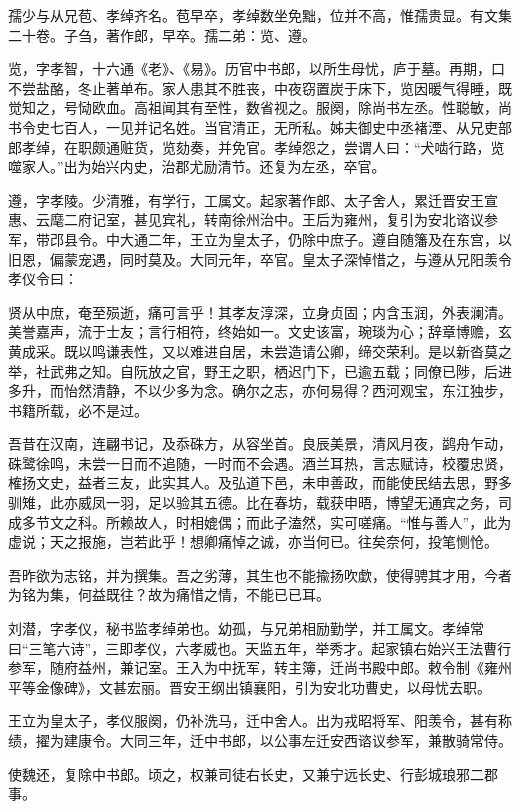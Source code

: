 \documentclass[12pt,UTF8]{ctexbook}
\begin{document}
孺少与从兄苞、孝绰齐名。苞早卒，孝绰数坐免黜，位并不高，惟孺贵显。有文集二十卷。子刍，著作郎，早卒。孺二弟：览、遵。

览，字孝智，十六通《老》、《易》。历官中书郎，以所生母忧，庐于墓。再期，口不尝盐酪，冬止著单布。家人患其不胜丧，中夜窃置炭于床下，览因暖气得睡，既觉知之，号恸欧血。高祖闻其有至性，数省视之。服阕，除尚书左丞。性聪敏，尚书令史七百人，一见并记名姓。当官清正，无所私。姊夫御史中丞褚湮、从兄吏部郎孝绰，在职颇通赃货，览劾奏，并免官。孝绰怨之，尝谓人曰：“犬啮行路，览噬家人。”出为始兴内史，治郡尤励清节。还复为左丞，卒官。

遵，字孝陵。少清雅，有学行，工属文。起家著作郎、太子舍人，累迁晋安王宣惠、云麾二府记室，甚见宾礼，转南徐州治中。王后为雍州，复引为安北谘议参军，带邔县令。中大通二年，王立为皇太子，仍除中庶子。遵自随籓及在东宫，以旧恩，偏蒙宠遇，同时莫及。大同元年，卒官。皇太子深悼惜之，与遵从兄阳羡令孝仪令曰：

贤从中庶，奄至殒逝，痛可言乎！其孝友淳深，立身贞固；内含玉润，外表澜清。美誉嘉声，流于士友；言行相符，终始如一。文史该富，琬琰为心；辞章博赡，玄黄成采。既以鸣谦表性，又以难进自居，未尝造请公卿，缔交荣利。是以新沓莫之举，社武弗之知。自阮放之官，野王之职，栖迟门下，已逾五载；同僚已陟，后进多升，而怡然清静，不以少多为念。确尔之志，亦何易得？西河观宝，东江独步，书籍所载，必不是过。

吾昔在汉南，连翩书记，及忝硃方，从容坐首。良辰美景，清风月夜，鹢舟乍动，硃鹭徐鸣，未尝一日而不追随，一时而不会遇。酒兰耳热，言志赋诗，校覆忠贤，榷扬文史，益者三友，此实其人。及弘道下邑，未申善政，而能使民结去思，野多驯雉，此亦威凤一羽，足以验其五德。比在春坊，载获申晤，博望无通宾之务，司成多节文之科。所赖故人，时相媲偶；而此子溘然，实可嗟痛。“惟与善人”，此为虚说；天之报施，岂若此乎！想卿痛悼之诚，亦当何已。往矣奈何，投笔恻怆。

吾昨欲为志铭，并为撰集。吾之劣薄，其生也不能揄扬吹歔，使得骋其才用，今者为铭为集，何益既往？故为痛惜之情，不能已已耳。

刘潜，字孝仪，秘书监孝绰弟也。幼孤，与兄弟相励勤学，并工属文。孝绰常曰“三笔六诗”，三即孝仪，六孝威也。天监五年，举秀才。起家镇右始兴王法曹行参军，随府益州，兼记室。王入为中抚军，转主簿，迁尚书殿中郎。敕令制《雍州平等金像碑》，文甚宏丽。晋安王纲出镇襄阳，引为安北功曹史，以母忧去职。

王立为皇太子，孝仪服阕，仍补洗马，迁中舍人。出为戎昭将军、阳羡令，甚有称绩，擢为建康令。大同三年，迁中书郎，以公事左迁安西谘议参军，兼散骑常侍。

使魏还，复除中书郎。顷之，权兼司徒右长史，又兼宁远长史、行彭城琅邪二郡事。
\end{document}
